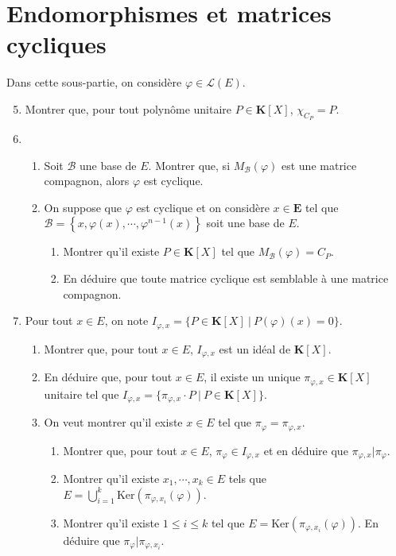 \documentclass[a4paper,11pt]{article}
\newcommand{\K}{\mathbf{K}}
\newcommand{\E}{\mathbf{E}}
\newcommand{\B}{\mathcal{B}}
\renewcommand{\L}{\mathcal{L}}
\begin{document}
\section{Endomorphismes et matrices cycliques}
Dans cette sous-partie, on considère $\varphi\in\L(E)$.\\
\begin{enumerate}
\setcounter{enumi}{4}
\item Montrer que, pour tout polynôme unitaire $P\in\K[X]$, $\chi_{C_P}=P$.
\item 
\begin{enumerate}
\item Soit $\B$ une base de $E$. Montrer que, si $M_\B(\varphi)$ est une matrice compagnon, alors $\varphi$ est cyclique.
\item On suppose que $\varphi$ est cyclique et on considère $x\in\E$ tel que $\B=\left\lbrace x,\varphi(x),\cdots,\varphi^{n-1}(x)\right\rbrace$ soit une base de $E$.
\begin{enumerate}
\item Montrer qu'il existe $P\in\K[X]$ tel que $M_\B(\varphi)=C_P$.
\item En déduire que toute matrice cyclique est semblable à une matrice compagnon.
\end{enumerate}
\end{enumerate}
\item Pour tout $x\in E$, on note $I_{\varphi,x}=\{P\in\K[X]\ \vert\ P(\varphi)(x)=0\}$.
\begin{enumerate}
\item Montrer que, pour tout $x\in E$, $I_{\varphi,x}$ est un idéal de $\K[X]$.
\item En déduire que, pour tout $x\in E$, il existe un unique $\pi_{\varphi,x}\in\K[X]$ unitaire tel que $I_{\varphi,x}=\{\pi_{\varphi,x}\cdot P\ \vert\ P\in\K[X]\}$.
\item On veut montrer qu'il existe $x\in E$ tel que $\pi_\varphi=\pi_{\varphi,x}$.
\begin{enumerate}
\item Montrer que, pour tout $x\in E$, $\pi_\varphi\in I_{\varphi,x}$ et en déduire que $\pi_{\varphi,x}\vert\pi_\varphi$.
\item Montrer qu'il existe $x_1,\cdots, x_k\in E$ tels que $E=\displaystyle\bigcup_{i=1}^k\mathrm{Ker}\left(\pi_{\varphi,x_i}(\varphi)\right)$.
\item Montrer qu'il existe $1\leq i\leq k$ tel que $E=\mathrm{Ker}\left(\pi_{\varphi,x_i}(\varphi)\right)$. En déduire que $\pi_\varphi\vert\pi_{\varphi,x_i}$.

\end{enumerate}
\end{enumerate}
\end{enumerate}
\end{document}
